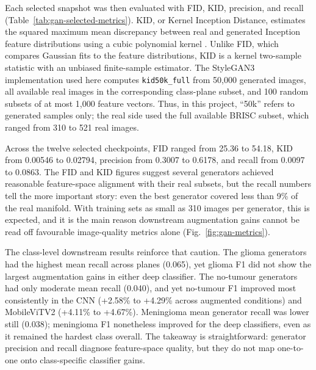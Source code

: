\documentclass[conference,twoside]{IEEEtran}
\begin{document}
Each selected snapshot was then evaluated with FID, KID, precision, and recall (Table~\ref{tab:gan-selected-metrics}). KID, or Kernel Inception Distance, estimates the squared maximum mean discrepancy between real and generated Inception feature distributions using a cubic polynomial kernel \cite{binkowski2018mmd}. Unlike FID, which compares Gaussian fits to the feature distributions, KID is a kernel two-sample statistic with an unbiased finite-sample estimator. The StyleGAN3 implementation used here computes \texttt{kid50k\_full} from 50,000 generated images, all available real images in the corresponding class-plane subset, and 100 random subsets of at most 1,000 feature vectors. Thus, in this project, ``50k'' refers to generated samples only; the real side used the full available BRISC subset, which ranged from 310 to 521 real images.

Across the twelve selected checkpoints, FID ranged from 25.36 to 54.18, KID from 0.00546 to 0.02794, precision from 0.3007 to 0.6178, and recall from 0.0097 to 0.0863. The FID and KID figures suggest several generators achieved reasonable feature-space alignment with their real subsets, but the recall numbers tell the more important story: even the best generator covered less than 9\% of the real manifold. With training sets as small as 310 images per generator, this is expected, and it is the main reason downstream augmentation gains cannot be read off favourable image-quality metrics alone (Fig.~\ref{fig:gan-metrics}).

The class-level downstream results reinforce that caution. The glioma generators had the highest mean recall across planes (0.065), yet glioma F1 did not show the largest augmentation gains in either deep classifier. The no-tumour generators had only moderate mean recall (0.040), and yet no-tumour F1 improved most consistently in the CNN (+2.58\% to +4.29\% across augmented conditions) and MobileViTV2 (+4.11\% to +4.67\%). Meningioma mean generator recall was lower still (0.038); meningioma F1 nonetheless improved for the deep classifiers, even as it remained the hardest class overall. The takeaway is straightforward: generator precision and recall diagnose feature-space quality, but they do not map one-to-one onto class-specific classifier gains.
\end{document}
